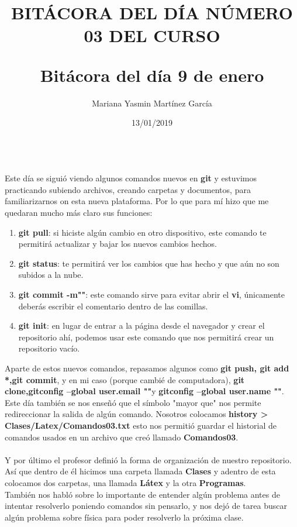 \documentclass[letterpaper, 12pt, twoside]{article}
\title{\Huge\item\color{red}\textbf {BITÁCORA DEL DÍA NÚMERO 03 DEL CURSO}}
\author{Mariana Yasmin Martínez García}
\date{13/01/2019}
\begin{document}
	\maketitle
	
	\newpage
	\title{\huge\textbf{Bitácora del día 9 de enero\\}} \\
	Este día se siguió viendo algunos comandos nuevos en \textbf{git} y estuvimos practicando subiendo archivos, creando carpetas y documentos, para familiarizarnos on esta nueva plataforma. Por lo que para mí hizo que me quedaran mucho más claro sus funciones:
	\begin{enumerate}
		\item\textbf{\large git pull}: si hiciste algún cambio en otro dispositivo, este comando te permitirá actualizar y bajar los nuevos cambios hechos.
		\item\textbf{\large git status}: te permitirá ver los cambios que has hecho y que aún no son subidos a la nube.
		\item\textbf{\large git commit -m""}: este comando sirve para evitar abrir el \textbf{vi}, únicamente deberás escribir el comentario dentro de las comillas.
		\item\textbf{\large git init}: en lugar de entrar a la página desde el navegador y crear el repositorio ahí, podemos usar este comando que nos permitirá crear un repositorio vacío.
	\end{enumerate}
    Aparte de estos nuevos comandos, repasamos algunos como \textbf{git push, git add *,git commit}, y en mi caso (porque cambié de computadora), \textbf{git clone,gitconfig --global user.email ""}y \textbf{gitconfig --global user.name ""}. \newline
	Este día también se nos enseñó que el símbolo "mayor que" nos permite redireccionar la salida de algún comando. Nosotros colocamos \textbf{history > Clases/Latex/Comandos03.txt} esto nos permitió guardar el historial de comandos usados en un archivo que creó llamado \textbf{Comandos03}. \\ \\
	Y por último el profesor definió la forma de organización de nuestro repositorio. Así que dentro de él hicimos una carpeta llamada \textbf{Clases} y adentro de esta colocamos dos carpetas, una llamada \textbf{Látex} y la otra \textbf{Programas}. \\
	También nos habló sobre lo importante de entender algún problema antes de intentar resolverlo poniendo comandos sin pensarlo, y nos dejó de tarea buscar algún problema sobre física para poder resolverlo la próxima clase.
	
\end{document}
